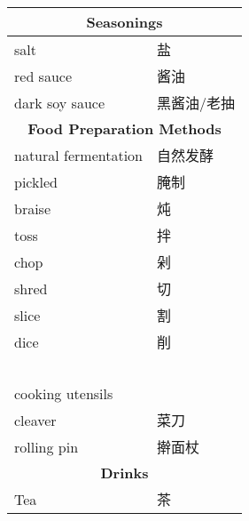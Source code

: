 \begin{longtable}{|p{7cm}|p{7cm}|}
    \multicolumn{2}{c}{\textbf{Seasonings}} \\ \hline
    salt & 盐 \\ \hline
    red sauce & 酱油 \\ \hline
    dark soy sauce & 黑酱油/老抽 \\ \hline
    
    \multicolumn{2}{c}{\textbf{Food Preparation Methods}} \\ \hline
    natural fermentation & 自然发酵 \\ \hline
    pickled & 腌制 \\ \hline
    braise & 炖 \\ \hline
    toss & 拌 \\ \hline
    chop & 剁 \\ \hline
    shred & 切 \\ \hline
    slice & 割 \\ \hline
    dice & 削 \\ \hline
    ~ & ~ \\ \hline
    cooking utensils & ~ \\ \hline
    cleaver & 菜刀 \\ \hline
    rolling pin & 擀面杖 \\ \hline
    
    \multicolumn{2}{c}{\textbf{Drinks}} \\ \hline
    Tea & 茶 \\ \hline
    

\end{longtable}
